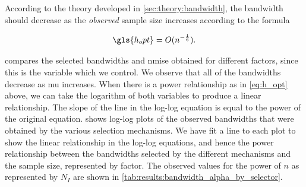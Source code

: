 According to the theory developed in \cref{sec:theory:bandwidth},
the bandwidth should decrease as the \textit{observed} sample size increases according to the formula

\begin{equation}
    \label{eq:h_opt}
    \gls{h_opt} = O(n^{-\frac{1}{6}}) \text{.}
\end{equation}

 compares the selected bandwidths and \gls{nmise} obtained for different \glspl{factor},
since this is the variable which we control.
We observe that all of the bandwidths decrease as \gls{mu} increases.
When there is a power relationship as in \cref{eq:h_opt} above, we can take the logarithm of both variables to produce a linear relationship.
The slope of the line in the log-log equation is equal to the power of the original equation.
 shows log-log plots of the observed bandwidths that were obtained by the various selection mechanisms.
We have fit a line to each plot to show the linear relationship in the log-log equations, and hence the power relationship between the bandwidths selected by the different mechanisms and the sample size, represented by \gls{factor}.
The observed values for the power of $n$ as represented by $N_I$ are shown in \cref{tab:results:bandwidth_alpha_by_selector}.





